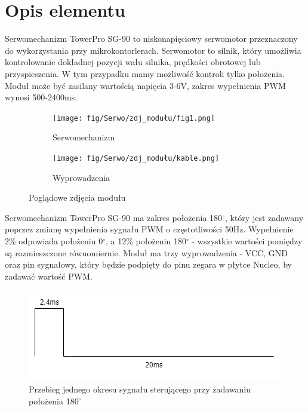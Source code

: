 \documentclass[11pt, a4paper]{article}
\author{Antoni Borowski}
\institute{Instytut Robotyki i Inteligencji Maszynowej}
\begin{document}
\newpage

\section*{Opis elementu} 
Serwomechanizm TowerPro SG-90 to niskonapięciowy serwomotor przeznaczony do wykorzystania przy mikrokontorlerach. Serwomotor to silnik, który umożliwia kontrolowanie dokładnej pozycji wału silnika, prędkości obrotowej lub przyspieszenia. W tym przypadku mamy możliwość kontroli tylko położenia. Moduł może być zasilany wartością napięcia 3-6V, zakres wypełnienia PWM wynosi 500-2400ms.

\begin{figure}[h!]
\centering
\begin{subfigure}{.5\textwidth}
  \centering
  \texttt{[image: fig/Serwo/zdj\_modułu/fig1.png]}
  \caption{Serwomechanizm}
  \label{fig:sub1}
\end{subfigure}%
\begin{subfigure}{.5\textwidth}
  \centering
  \texttt{[image: fig/Serwo/zdj\_modułu/kable.png]}
  \caption{Wyprowadzenia}
  \label{fig:sub2}
\end{subfigure}
\caption{Poglądowe zdjęcia modułu}
\label{fig:test}
\end{figure}

\newline
Serwomechanizm TowerPro SG-90 ma zakres położenia 180$^{\circ}$, który jest zadawany poprzez zmianę wypełnienia sygnału PWM o częstotliwości 50Hz. Wypełnienie 2\% odpowiada położeniu 0$^{\circ}$, a 12\% położeniu 180$^{\circ}$ - wszystkie wartości pomiędzy są rozmieszczone równomiernie. Moduł ma trzy wyprowadzenia - VCC, GND oraz pin sygnałowy, który będzie podpięty do pinu zegara w płytce Nucleo, by zadawać wartość PWM.
\begin{figure}[h!]
\centering
  \centering
  \includegraphics[width=1\linewidth]{fig/Serwo/zasada_dzialania/jeden cykl.png}
  \caption{Przebieg jednego okresu sygnału sterującego przy zadawaniu położenia 180$^{\circ}$}
  \label{fig:sub1}
\end{figure}
\end{document}
